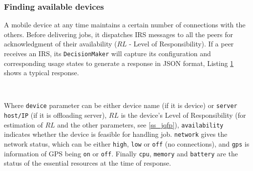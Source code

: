 \documentclass{sig-alternate}[10pt]
\begin{document}
\subsubsection{Finding available devices}\label{ss_dfp}

A mobile device at any time maintains a certain number of connections with the others. Before delivering jobs, it dispatches IRS messages to all the peers for acknowledgment of their availability ($RL$ - Level of Responsibility). If a peer receives an IRS, its \texttt{DecisionMaker} will capture its configuration and corresponding usage states to generate a response in JSON format, Listing \ref{code:jsonResponse} shows a typical response.\\

\begin{figure}
\noindent {}	\\
\noindent {}	

\label{code:jsonResponse}

\end{figure}

Where \texttt{device} parameter can be either device name (if it is device) or \texttt{server host/IP} (if it is offloading server), $RL$ is the device's Level of Responsibility (for estimation of $RL$ and the other parameters, see \ref{ss_jqfp}), \texttt{availability} indicates whether the device is feasible for handling job. \texttt{network} gives the network status, which can be either \texttt{high}, \texttt{low} or \texttt{off} (no connections), and \texttt{gps} is information of GPS being \texttt{on} or \texttt{off}. Finally \texttt{cpu}, \texttt{memory} and \texttt{battery} are the status of the essential resources at the time of response. 
\end{document}
